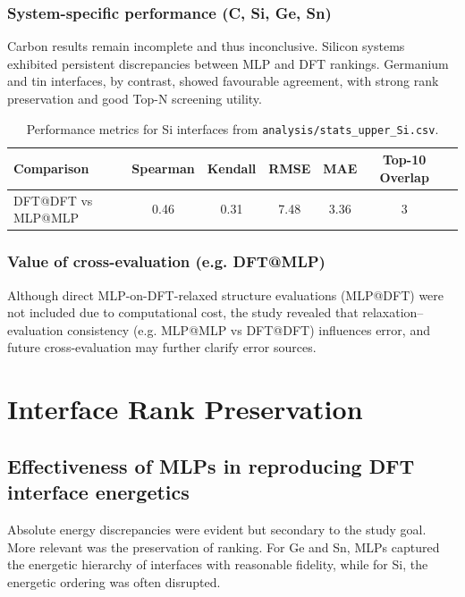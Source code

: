 \subsubsection{System-specific performance (C, Si, Ge, Sn)}

Carbon results remain incomplete and thus inconclusive. Silicon systems exhibited persistent discrepancies between MLP and DFT rankings. Germanium and tin interfaces, by contrast, showed favourable agreement, with strong rank preservation and good Top-N screening utility.

\begin{table}[h]
    \centering
    \caption{Performance metrics for Si interfaces from \texttt{analysis/stats_upper_Si.csv}.}
    \begin{tabular}{lcccccc}
        Comparison & Spearman & Kendall & RMSE & MAE & Top-10 Overlap \\
        \hline
        DFT@DFT vs MLP@MLP & 0.46 & 0.31 & 7.48 & 3.36 & 3 \\
    \end{tabular}
\end{table}

\subsubsection{Value of cross-evaluation (e.g. DFT@MLP)}

Although direct MLP-on-DFT-relaxed structure evaluations (MLP@DFT) were not included due to computational cost, the study revealed that relaxation--evaluation consistency (e.g. MLP@MLP vs DFT@DFT) influences error, and future cross-evaluation may further clarify error sources.


\section{Interface Rank Preservation} \label{section:interface_rank_preservation}

\subsection{Effectiveness of MLPs in reproducing DFT interface energetics}

Absolute energy discrepancies were evident but secondary to the study goal. More relevant was the preservation of ranking. For Ge and Sn, MLPs captured the energetic hierarchy of interfaces with reasonable fidelity, while for Si, the energetic ordering was often disrupted.

